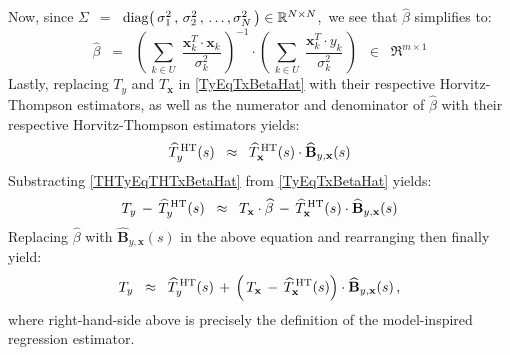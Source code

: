 \begin{remark}
\vskip 0.3cm
\noindent
Now, since $\Sigma$
\,$=$\, $\textnormal{diag}\!\left(\,\sigma_{1}^{2}\,,\,\sigma_{2}^{2}\,,\,\ldots,\sigma_{N}^{2}\,\right) \in \mathbb{R}^{N \times N}$,\,
we see that $\widehat{\beta}$ simplifies to:
\begin{equation*}
\widehat{\beta}
\;\; = \;\;
	\left(\,\underset{k \in U}{\sum}\;\dfrac{\mathbf{x}_{k}^{T} \cdot \mathbf{x}_{k}}{\sigma_{k}^{2}} \,\right)^{-1}
	\cdot
	\left(\,\underset{k \in U}{\sum}\;\dfrac{\mathbf{x}_{k}^{T} \cdot y_{k}}{\sigma_{k}^{2}} \,\right)
	\;\; \in \;\;
	\Re^{m \times 1}
\end{equation*}
Lastly, replacing $T_{y}$ and $T_{\mathbf{x}}$ in \eqref{TyEqTxBetaHat}
with their respective Horvitz-Thompson estimators,
as well as the numerator and denominator of $\widehat{\beta}$
with their respective Horvitz-Thompson estimators yields:
\begin{equation}\label{THTyEqTHTxBetaHat}
\widehat{T}_{y}^{\,\textnormal{HT}}(s)
\;\; \approx \;\; \widehat{T}_{\mathbf{x}}^{\,\textnormal{HT}}(s) \cdot \widehat{\mathbf{B}}_{y,\mathbf{x}}(s)
\end{equation}
Substracting \eqref{THTyEqTHTxBetaHat} from \eqref{TyEqTxBetaHat} yields:
\begin{equation*}
T_{y}
	\,-\,
	\widehat{T}_{y}^{\,\textnormal{HT}}(s)
\;\; \approx \;\;
	T_{\mathbf{x}} \cdot \widehat{\beta}
	\,-\,
	\widehat{T}_{\mathbf{x}}^{\,\textnormal{HT}}(s) \cdot \widehat{\mathbf{B}}_{y,\mathbf{x}}(s)
\end{equation*}
Replacing $\widehat{\beta}$ with $\widehat{\mathbf{B}}_{y,\mathbf{x}}(s)$ in the above equation
and rearranging then finally yield:
\begin{equation*}
T_{y}
\;\; \approx \;\;
	\widehat{T}_{y}^{\,\textnormal{HT}}(s)
	\,+\,
	\left(\,T_{\mathbf{x}} \,-\, \widehat{T}_{\mathbf{x}}^{\,\textnormal{HT}}(s) \right)
	\cdot \widehat{\mathbf{B}}_{y,\mathbf{x}}(s)\,,
\end{equation*}
where right-hand-side above is precisely the definition of the model-inspired regression estimator.
\end{remark}


\renewcommand{\theenumi}{\roman{enumi}}
\renewcommand{\labelenumi}{\textnormal{(\theenumi)}$\;\;$}

